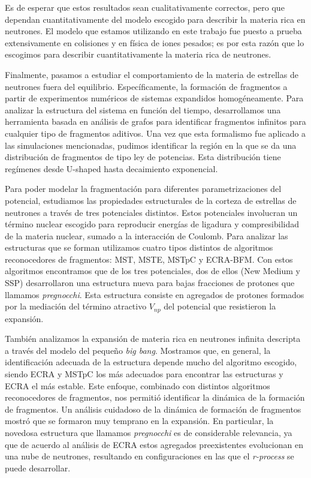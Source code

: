 Es de esperar que estos resultados sean cualitativamente correctos, pero que dependan cuantitativamente del modelo escogido para describir la materia rica en neutrones.
El modelo que estamos utilizando en este trabajo fue puesto a prueba extensivamente en colisiones y en física de iones pesados; es por esta razón que lo escogimos para describir cuantitativamente la materia rica de neutrones.


Finalmente, pasamos a estudiar el comportamiento de la materia de estrellas de neutrones fuera del equilibrio.
Específicamente, la formación de fragmentos a partir de experimentos numéricos de sistemas expandidos homogéneamente.
Para analizar la estructura del sistema en función del tiempo, desarrollamos una herramienta basada en análisis de grafos para identificar fragmentos infinitos para cualquier tipo de fragmentos aditivos.
Una vez que esta formalismo fue aplicado a las simulaciones mencionadas, pudimos identificar la región en la que se da una distribución de fragmentos de tipo ley de potencias.
Esta distribución tiene regímenes desde U-shaped hasta decaimiento exponencial.

Para poder modelar la fragmentación para diferentes parametrizaciones del potencial, estudiamos las propiedades estructurales de la corteza de estrellas de neutrones a través de tres potenciales distintos.
Estos potenciales involucran un término nuclear escogido para reproducir energías de ligadura y compresibilidad de la materia nuclear, sumado a la interacción de Coulomb.
Para analizar las estructuras que se forman utilizamos cuatro tipos distintos de algoritmos reconocedores de fragmentos: MST, MSTE, MSTpC y ECRA-BFM.
Con estos algoritmos encontramos que de los tres potenciales, dos de ellos (New Medium y SSP) desarrollaron una estructura nueva para bajas fracciones de protones que llamamos \emph{pregnocchi}.
Esta estructura consiste en agregados de protones formados por la mediación del término atractivo $V_{np}$ del potencial que resistieron la expansión.

También analizamos la expansión de materia rica en neutrones infinita descripta a través del modelo del pequeño \emph{big bang}.
Mostramos que, en general, la identificación adecuada de la estructura depende mucho del algoritmo escogido, siendo ECRA y MSTpC los más adecuados para encontrar las estructuras y ECRA el más estable.
Este enfoque, combinado con distintos algoritmos reconocedores de fragmentos, nos permitió identificar la dinámica de la formación de fragmentos.
Un análisis cuidadoso de la dinámica de formación de fragmentos mostró que se formaron muy temprano en la expansión.
En particular, la novedosa estructura que llamamos \emph{pregnocchi} es de considerable relevancia, ya que de acuerdo al análisis de ECRA estos agregados preexistentes evolucionan en una nube de neutrones, resultando en configuraciones en las que el \emph{r-process} se puede desarrollar.

